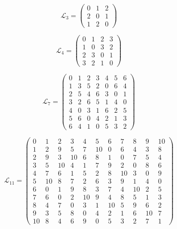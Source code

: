 $$\mathcal{L}_{3}=
\left(\begin{array}{ccc}
0 & 1 & 2\\
2 & 0 & 1\\
1 & 2 & 0
\end{array}\right)$$

$$\mathcal{L}_{4}=
\left(\begin{array}{cccc}
0&1&2&3\\
1&0&3&2\\
2&3&0&1\\
3&2&1&0
\end{array}\right)$$

$$\mathcal{L}_{7}=
\left(\begin{array}{ccccccc}
0&1&2&3&4&5&6\\
1&3&5&2&0&6&4\\
2&5&4&6&3&0&1\\
3&2&6&5&1&4&0\\
4&0&3&1&6&2&5\\
5&6&0&4&2&1&3\\
6&4&1&0&5&3&2
\end{array}\right)$$

$$\mathcal{L}_{11}=
\left(\begin{array}{ccccccccccc}
0&1&2&3&4&5&6&7&8&9&10\\
1&2&9&5&7&10&0&6&4&3&8\\
2&9&3&10&6&8&1&0&7&5&4\\
3&5&10&4&1&7&9&2&0&8&6\\
4&7&6&1&5&2&8&10&3&0&9\\
5&10&8&7&2&6&3&9&1&4&0\\
6&0&1&9&8&3&7&4&10&2&5\\
7&6&0&2&10&9&4&8&5&1&3\\
8&4&7&0&3&1&10&5&9&6&2\\
9&3&5&8&0&4&2&1&6&10&7\\
10&8&4&6&9&0&5&3&2&7&1
\end{array}\right)$$

